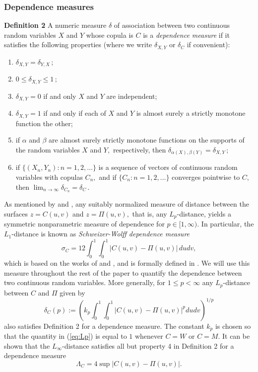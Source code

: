 \documentclass[journal]{vgtc}                %
\begin{document}
\subsubsection{Dependence measures}

\textbf{Definition 2} A numeric measure $\delta$ of association between two continuous random variables $X$ and $Y$ whose copula is $C$ is a \textit{dependence measure} if it satisfies the following properties (where we write $\delta_{X,Y}$ or $\delta_C$ if convenient):
\begin{enumerate}
    \item $\delta_{X,Y}=\delta_{Y,X}\,;$
    \item $0\leq\delta_{X,Y}\leq 1\,;$
    \item $\delta_{X,Y}=0$ if and only $X$ and $Y$ are independent;
    \item $\delta_{X,Y}=1$ if and only if each of $X$ and $Y$ is almost surely a strictly monotone function the other;
    \item if $\alpha$ and $\beta$ are almost surely strictly monotone functions on the supports of the random variables $X$ and $Y,$ respectively, then $\delta_{\alpha(X),\beta(Y)}=\delta_{X,Y}\,;$
    \item if $\{(X_n,Y_n): n = 1,2,\ldots\}$ is a sequence of vectors of continuous random variables with copulas $C_n,$ and if $\{C_n:n=1,2,\ldots\}$ converges pointwise to $C,$ then $\lim_{n\rightarrow\infty}\delta_{C_n}=\delta_C\,.$
\end{enumerate}

As mentioned by \cite{Schweizer1981} and \cite{Nelsen1999}, any suitably normalized measure of distance between the surfaces $z=C(u,v)$ and $z=\Pi(u,v),$ that is, any $L_p$-distance, yields a symmetric nonparametric measure of dependence for $p\in[1,\infty).$ In particular, the $L_1$-distance is known as \textit{Schweizer-Wolff dependence measure}
\begin{equation}\label{eq:SchweizerWolff}
    \sigma_C = 12\int_0^1\!\!\!\int_0^1 |C(u,v) - \Pi(u,v)|\,dudv,
\end{equation}
which is based on the works of \cite{Renyi1959} and \cite{Schweizer1981}, and is formally defined in \cite{Nelsen1999}. We will use this measure throughout the rest of the paper to quantify the dependence between two continuous random variables. More generally, for $1\leq p<\infty$ any $L_p$-distance between $C$ and $\Pi$ given by
\begin{equation}\label{eq:Lp}
    \delta_C(p) := \left(k_p\int_0^1\!\!\!\int_0^1|C(u,v)-\Pi(u,v)|^p dudv\right)^{1/p}
\end{equation}
also satisfies Definition 2 for a dependence measure. The constant $k_p$ is chosen so that the quantity in (\ref{eq:Lp}) is equal to $1$ whenever $C=W$ or $C=M$. It can be shown that the $L_{\infty}$-distance satisfies all but property 4 in Definition 2 for a dependence measure \cite{Nelsen1999}
\begin{equation}\label{eq:Linf}
    \Lambda_C = 4\sup |C(u,v) - \Pi(u,v)|.
\end{equation}
\end{document}

